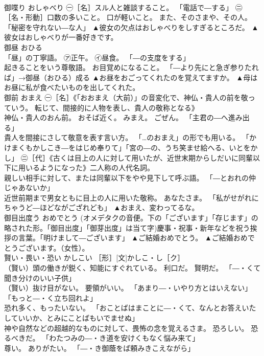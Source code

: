 \documentclass[8pt]{extreport}
\begin{document}
\begin{CJK}{UTF8}{min}
\\	御喋り	おしゃべり	㊀［名］スル人と雑談すること。 「電話で―する」 ㊁［名・形動］口数の多いこと。 口が軽いこと。 また、そのさまや、その人。 「秘密を守れない―な人」	▲彼女の欠点はおしゃべりをしすぎるところだ。 ▲彼女はおしゃべりが一番好きです。
\\	御昼	おひる	
\\	「昼」の丁寧語。 ㋐正午。 ㋑昼食。 「―の支度をする」 
\\	起きることをいう尊敬語。 お目覚めになること。 「―より先にと急ぎ参りたれば」→御昼（おひる）成る	▲お昼をおごってくれたのを覚えてますか。 ▲母はお昼に私が食べたいものを出してくれた。
\\	御前	おまえ	㊀［名］《「おおまえ（大前）」の音変化で、神仏・貴人の前を敬っていう。 転じて、間接的に人物を表し、貴人の敬称となる》 
\\	神仏・貴人のおん前。 おそば近く。 みまえ。 ごぜん。 「主君の―へ進み出る」 
\\	貴人を間接にさして敬意を表す言い方。 「…のおまえ」の形でも用いる。 「かけまくもかしこき―をはじめ奉りて」「宮の―の、うち笑ませ給へる、いとをかし」 ㊁［代］《古くは目上の人に対して用いたが、近世末期からしだいに同輩以下に用いるようになった》二人称の人代名詞。 
\\	親しい相手に対して、または同輩以下をやや見下して呼ぶ語。 「―とおれの仲じゃあないか」 
\\	近世前期まで男女ともに目上の人に用いた敬称。 あなたさま。 「私がせがれにちゃうど―ほどながござれども」	▲おまえ、変わってるな。
\\	御目出度う	おめでとう	(オメデタクの音便。下の「ございます」「存じます」の略された形。「御目出度」「御芽出度」は当て字)慶事・祝事・新年などを祝う挨拶の言葉。「明けまして―ございます」	▲ご結婚おめでとう。 ▲ご結婚おめでとうございます。（女性）。
\\	賢い・畏い・恐い	かしこい	［形］[文]かしこ・し［ク］ 
\\	（賢い）頭の働きが鋭く、知能にすぐれている。 利口だ。 賢明だ。 「―・くて聞き分けのいい子供」 
\\	（賢い）抜け目がない。 要領がいい。 「あまり―・いやり方とはいえない」「もっと―・く立ち回れよ」 
\\	恐れ多く、もったいない。 「おことばはまことに―・くて、なんとお答えいたしていいか、とみにことばもいでませぬ」 
\\	神や自然などの超越的なものに対して、畏怖の念を覚えるさま。 恐ろしい。 恐るべきだ。 「わたつみの―・き道を安けくもなく悩み来て」 
\\	尊い。 ありがたい。 「―・き御蔭をば頼みきこえながら」 

\end{CJK}
\end{document}
